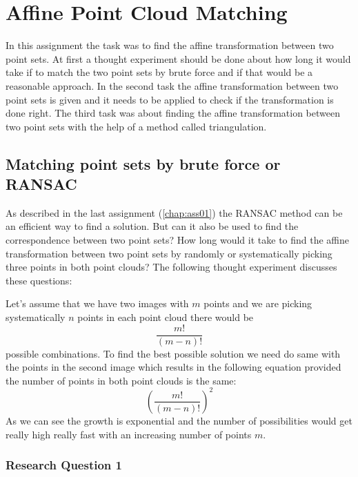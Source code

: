 \chapter{Affine Point Cloud Matching}

In this assignment the task was to find the affine transformation between two point sets. At first a thought experiment should be done about how long it would take if to match the two point sets by brute force and if that would be a reasonable approach. In the second task the affine transformation between two point sets is given and it needs to be applied to check if the transformation is done right. The third task was about finding the affine transformation between two point sets with the help of a method called triangulation.

\section{Matching point sets by brute force or RANSAC}

As described in the last assignment (\autoref{chap:ass01}) the RANSAC method can be an efficient way to find a solution. But can it also be used to find the correspondence between two point sets? How long would it take to find the affine transformation between two point sets by randomly or systematically picking three points in both point clouds? The following thought experiment discusses these questions:

Let's assume that we have two images with $m$ points and we are picking systematically $n$ points in each point cloud there would be 
 \begin{equation}
 	\frac{m!}{(m-n)!}
\end{equation}
possible combinations. To find the best possible solution we need do same with the points in the second image which results in the following equation provided the number of points in both point clouds is the same:
\begin{equation}
	\left(\frac{m!}{(m-n)!}\right)^2
\end{equation}
As we can see the growth is exponential and the number of possibilities would get really high really fast with an increasing number of points $m$.

\subsection{Research Question 1}

